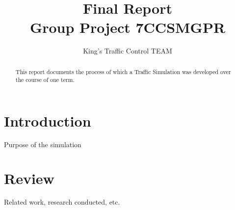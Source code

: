 \documentclass{article}[11pt,Tahoma]
\begin{document}
	\title{Final Report\\ Group Project 7CCSMGPR} 	
    \author{King's Traffic Control TEAM}
	\maketitle
	\begin{abstract}
		This report documents the process of which a Traffic Simulation was developed over the course of one term.
	\end{abstract}
	\clearpage
	\tableofcontents
	\section{Introduction}
		Purpose of the simulation
	\section{Review}
		Related work, research conducted, etc.
\end{document}
